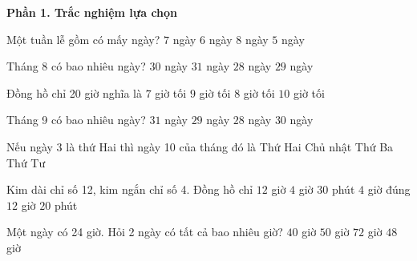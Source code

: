 \textbf{Phần 1. Trắc nghiệm lựa chọn}

\begin{ex} %
Một tuần lễ gồm có mấy ngày?
\choice
{\True $7$ ngày}
{$6$ ngày}
{$8$ ngày}
{$5$ ngày}
\end{ex}

\begin{ex} %
Tháng 8 có bao nhiêu ngày?
\choice
{$30$ ngày}
{\True $31$ ngày}
{$28$ ngày}
{$29$ ngày}
\end{ex}

\begin{ex} %
Đồng hồ chỉ 20 giờ nghĩa là
\choice
{$7$ giờ tối}
{$9$ giờ tối}
{\True $8$ giờ tối}
{$10$ giờ tối}
\end{ex}

\begin{ex} %
Tháng 9 có bao nhiêu ngày?
\choice
{$31$ ngày}
{$29$ ngày}
{$28$ ngày}
{\True $30$ ngày}
\end{ex}

\begin{ex} %
Nếu ngày 3 là thứ Hai thì ngày 10 của tháng đó là
\choice
{\True Thứ Hai}
{Chủ nhật}
{Thứ Ba}
{Thứ Tư}
\end{ex}

\begin{ex} %
Kim dài chỉ số 12, kim ngắn chỉ số 4. Đồng hồ chỉ
\choice
{$12$ giờ}
{$4$ giờ $30$ phút}
{\True $4$ giờ đúng}
{$12$ giờ $20$ phút}
\end{ex}

\begin{ex} %
Một ngày có 24 giờ. Hỏi 2 ngày có tất cả bao nhiêu giờ?
\choice
{$40$ giờ}
{$50$ giờ}
{$72$ giờ}
{\True $48$ giờ}
\end{ex}

